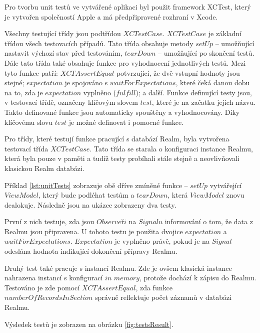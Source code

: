 \documentclass[thesis=M,czech]{FITthesis}[2012/06/26]
\begin{document}
Pro tvorbu unit testů ve vytvářené aplikaci byl použit framework XCTest, který je vytvořen společností Apple a má předpřipravené rozhraní v Xcode. \cite{appleTesting}

Všechny testující třídy jsou podtřídou $XCTestCase$. $XCTestCase$ je základní třídou všech testovacích případů. Tato třída obsahuje metody $setUp$ -- umožňující nastavit výchozí stav před testováním, $tearDown$ -- umožňující  po skončení testů. Dále tato třída také obsahuje funkce pro vyhodnocení jednotlivých testů. Mezi tyto funkce patří: $XCTAssertEqual$ potvrzující, že dvě vstupní hodnoty jsou stejné; $expectation$ je spojováno s $waitForExpectations$, které čeká danou dobu na to, zda je $expectation$ vyplněno ($fulfill$); a další. Funkce definující testy jsou, v testovací třídě, označeny klíčovým slovem $test$, které je na začatku jejich názvu. Takto definované funkce jsou automaticky spouštěny a vyhodnocovány. Díky klíčovému slovu $test$ je možné definovat i pomocné funkce. \cite{XCTestCase}

Pro třídy, které testují funkce pracující s databází Realm, byla vytvořena testovací třída $XCTestCase$. Tato třída se starala o konfiguraci instance Realmu, která byla pouze v paměti a tudíž testy probíhali stále stejně a neovlivňovali klasickou Realm databázi.

Příklad \ref{lst:unitTests} zobrazuje obě dříve zmíněné funkce -- $setUp$ vytvářející $ViewModel$, který bude podléhat testům a $tearDown$, která $ViewModel$ znovu dealokuje. Následně jsou na ukázce zobrazeny dva testy. 

První z nich testuje, zda jsou $Observeři$ na $Signalu$ informování o tom, že data z Realmu jsou připravena. U tohoto testu je použita dvojice $expectation$ a $waitForExpectations$. $Expectation$ je vyplněno právě, pokud je na $Signal$ odeslána hodnota indikující dokončení přípravy Realmu. 

Druhý test také pracuje s instancí Realmu. Zde je ovšem klasická instance nahrazena instancí s konfigurací $in$ $memory$, protože dochází k zápisu do Realmu. Testováno je zde pomocí $XCTAssertEqual$, zda funkce $numberOfRecordsInSection$ správně reflektuje počet záznamů v databázi Realmu.

Výsledek testů je zobrazen na obrázku \ref{fig:testsResult}.
\end{document}
